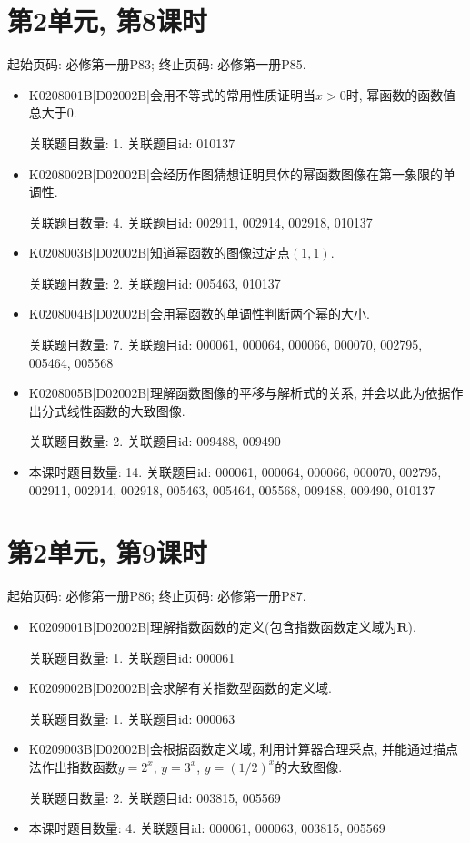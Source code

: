 \section*{第2单元, 第8课时}
起始页码: 必修第一册P83; 终止页码: 必修第一册P85.
\begin{itemize}
\item K0208001B|D02002B|会用不等式的常用性质证明当$x>0$时, 幂函数的函数值总大于$0$.

关联题目数量: 1. 关联题目id: 010137

\item K0208002B|D02002B|会经历作图猜想证明具体的幂函数图像在第一象限的单调性.

关联题目数量: 4. 关联题目id: 002911, 002914, 002918, 010137

\item K0208003B|D02002B|知道幂函数的图像过定点$(1,1)$.

关联题目数量: 2. 关联题目id: 005463, 010137

\item K0208004B|D02002B|会用幂函数的单调性判断两个幂的大小.

关联题目数量: 7. 关联题目id: 000061, 000064, 000066, 000070, 002795, 005464, 005568

\item K0208005B|D02002B|理解函数图像的平移与解析式的关系, 并会以此为依据作出分式线性函数的大致图像.

关联题目数量: 2. 关联题目id: 009488, 009490

\item 本课时题目数量: 14. 关联题目id: 000061, 000064, 000066, 000070, 002795, 002911, 002914, 002918, 005463, 005464, 005568, 009488, 009490, 010137

\end{itemize}

\section*{第2单元, 第9课时}
起始页码: 必修第一册P86; 终止页码: 必修第一册P87.
\begin{itemize}
\item K0209001B|D02002B|理解指数函数的定义(包含指数函数定义域为$\mathbf{R}$).

关联题目数量: 1. 关联题目id: 000061

\item K0209002B|D02002B|会求解有关指数型函数的定义域.

关联题目数量: 1. 关联题目id: 000063

\item K0209003B|D02002B|会根据函数定义域, 利用计算器合理采点, 并能通过描点法作出指数函数$y=2^{x}$, $y=3^{x}$, $y=(1/2)^{x}$的大致图像.

关联题目数量: 2. 关联题目id: 003815, 005569

\item 本课时题目数量: 4. 关联题目id: 000061, 000063, 003815, 005569

\end{itemize}

